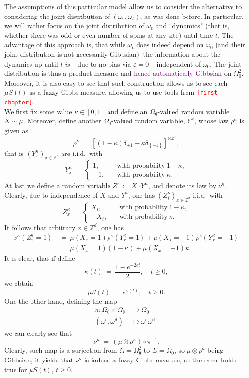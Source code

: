 \documentclass[12pt]{article}
\newcommand{\Z}{\mathbb{Z}}
\newcommand{\set}[1]{\left\{#1\right\}}
\newcommand{\oglati}[1]{\left[#1\right]}
\newcommand{\ra}{\rightarrow}
\newcommand{\1}{\mathbbm{1}}
\renewcommand{\c}{\mathsf{c}}
\newcommand{\5}{\vspace{0.5cm}}
\theoremstyle{definition}
\begin{document}
The assumptions of this particular model allow us to consider the alternative to considering the joint distribution of $(\omega_0,\omega_t)$, as was done before. In particular, we will rather focus on the joint distribution of $\omega_0$ and ``dynamics'' (that is, whether there was odd or even number of spins at any site) until time $t$. The advantage of this approach is, that while $\omega_t$ does indeed depend on $\omega_0$ (and their joint distribution is not necessarily Gibbsian), the information about the dynamics up until $t$ \textit{is} -- due to no bias via $\varepsilon=0$ -- independent of $\omega_0$. The joint distribution is thus a product measure and \textcolor{purple}{hence automatically Gibbsian} on $\Omega_0^2$. Moreover, it is also easy to see that such construction allows us to see each $\mu S(t)$ as a fuzzy Gibbs measure, allowing us to use tools from \textcolor{red}{\texttt{[first chapter]}}. \\

We first fix some value $\kappa\in[0,1]$ and define an $\Omega_0$-valued random variable $X\sim\mu$. Moreover, define another $\Omega_0$-valued random variable, $Y^\kappa$, whose law $\rho^\kappa$ is given as
$$\rho^\kappa ~=~ \oglati{(1-\kappa)\delta_{+1}-\kappa\delta_{\set{-1}}}^{\otimes\Z^d},$$
that is $(Y_x^\kappa)_{x\in\Z^d}$ are i.i.d.~with
$$Y_x^\kappa ~=~ \begin{cases}
1, \quad &\text{with probability}~1-\kappa,\\
-1, \quad &\text{with probability}~\kappa.	
\end{cases}$$
At last we define a random variable $Z^\kappa:=X\cdot Y^\kappa$, and denote its law by $\nu^\kappa$. Clearly, due to independence of $X$ and $Y^\kappa$, one has $(Z_i^\kappa)_{x\in\Z^d}$ i.i.d.~with 
$$Z_x^\kappa ~=~ \begin{cases}
X_i, \quad &\text{with probability}~1-\kappa,\\
-X_i, \quad &\text{with probability}~\kappa.
\end{cases}$$
It follows that arbitrary $x\in\Z^d$, one has
\begin{align*}
\nu^\kappa(Z_x^\kappa=1) ~&=~ \mu(X_x=1)\rho^\kappa(Y_x^\kappa=1) + \mu(X_x=-1)\rho^\kappa(Y_x^\kappa=-1) \\
&=~ \mu(X_x=1)(1-\kappa)+\mu(X_x=-1)\kappa.
\end{align*}
It is clear, that if define 
$$\kappa(t) ~=~ \frac{1-e^{-2ct}}{2}, \quad t\geq 0,$$
we obtain
$$\mu S(t) ~=~ \nu^{\kappa(t)}, \quad t\geq 0.$$
One the other hand, defining the map
\begin{align*}
\pi:\Omega_0\times\Omega_0&\ra\Omega_0 \\
(\omega^\c,\omega^\mathsf{d})&\mapsto\omega^\c\omega^\mathsf{d},
\end{align*}
we can clearly see that
$$\nu^{\kappa} ~=~ (\mu\otimes\rho^\kappa)\circ\pi^{-1}.$$
Clearly, such map is a surjection from $\Omega=\Omega_0^2$ to $\Sigma=\Omega_0$, so $\mu\otimes\rho^\kappa$ being Gibbsian, it yields that $\nu^\kappa$ is indeed a fuzzy Gibbs measure, so the same holds true for $\mu S(t)$, $t\geq 0$. \\
\end{document}

